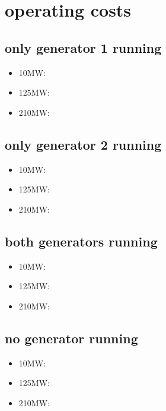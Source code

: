 \documentclass{article}
\begin{document}
	\section{operating costs}
		\subsection{only generator 1 running}
			\begin{itemize}
				\item 10MW:
				\item 125MW:
				\item 210MW:
			\end{itemize}

		\subsection{only generator 2 running}
			\begin{itemize}
				\item 10MW:
				\item 125MW:
				\item 210MW:
			\end{itemize}

		\subsection{both generators running}
			\begin{itemize}
				\item 10MW:
				\item 125MW:
				\item 210MW:
			\end{itemize}

		\subsection{no generator running}
			\begin{itemize}
				\item 10MW:
				\item 125MW:
				\item 210MW:
			\end{itemize}
\end{document}
